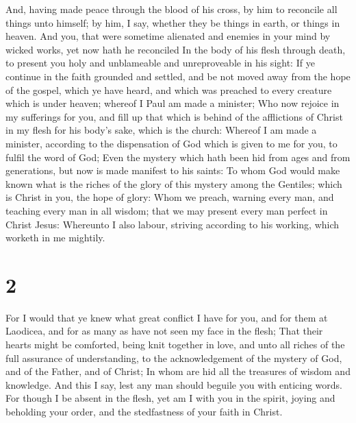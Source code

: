  And, having made peace through the blood of his cross, by
him to reconcile all things unto himself; by him, I say, whether they be
things in earth, or things in heaven.  And you, that were
sometime alienated and enemies in your mind by wicked works, yet now
hath he reconciled  In the body of his flesh through death,
to present you holy and unblameable and unreproveable in his sight:
 If ye continue in the faith grounded and settled, and be
not moved away from the hope of the gospel, which ye have heard, and
which was preached to every creature which is under heaven; whereof I
Paul am made a minister;  Who now rejoice in my sufferings
for you, and fill up that which is behind of the afflictions of Christ
in my flesh for his body's sake, which is the church: 
Whereof I am made a minister, according to the dispensation of God which
is given to me for you, to fulfil the word of God;  Even
the mystery which hath been hid from ages and from generations, but now
is made manifest to his saints:  To whom God would make
known what is the riches of the glory of this mystery among the
Gentiles; which is Christ in you, the hope of glory:  Whom
we preach, warning every man, and teaching every man in all wisdom; that
we may present every man perfect in Christ Jesus: 
Whereunto I also labour, striving according to his working, which
worketh in me mightily.

\hypertarget{section-1}{%
\section{2}\label{section-1}}

 For I would that ye knew what great conflict I have for
you, and for them at Laodicea, and for as many as have not seen my face
in the flesh;  That their hearts might be comforted, being
knit together in love, and unto all riches of the full assurance of
understanding, to the acknowledgement of the mystery of God, and of the
Father, and of Christ;  In whom are hid all the treasures of
wisdom and knowledge.  And this I say, lest any man should
beguile you with enticing words.  For though I be absent in
the flesh, yet am I with you in the spirit, joying and beholding your
order, and the stedfastness of your faith in Christ.

